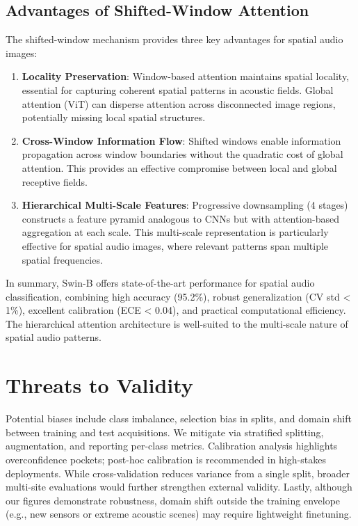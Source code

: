 \documentclass[11pt,a4paper]{article}
\begin{document}
\subsection{Advantages of Shifted-Window Attention}

The shifted-window mechanism provides three key advantages for spatial audio images:

\begin{enumerate}[leftmargin=*]
\item \textbf{Locality Preservation}: Window-based attention maintains spatial locality, essential for capturing coherent spatial patterns in acoustic fields. Global attention (ViT) can disperse attention across disconnected image regions, potentially missing local spatial structures.

\item \textbf{Cross-Window Information Flow}: Shifted windows enable information propagation across window boundaries without the quadratic cost of global attention. This provides an effective compromise between local and global receptive fields.

\item \textbf{Hierarchical Multi-Scale Features}: Progressive downsampling (4 stages) constructs a feature pyramid analogous to CNNs but with attention-based aggregation at each scale. This multi-scale representation is particularly effective for spatial audio images, where relevant patterns span multiple spatial frequencies.
\end{enumerate}

In summary, Swin-B offers state-of-the-art performance for spatial audio classification, combining high accuracy (95.2\%), robust generalization (CV std < 1\%), excellent calibration (ECE < 0.04), and practical computational efficiency. The hierarchical attention architecture is well-suited to the multi-scale nature of spatial audio patterns.

\section{Threats to Validity}
Potential biases include class imbalance, selection bias in splits, and domain shift between training and test acquisitions. We mitigate via stratified splitting, augmentation, and reporting per-class metrics. Calibration analysis highlights overconfidence pockets; post-hoc calibration is recommended in high-stakes deployments. While cross-validation reduces variance from a single split, broader multi-site evaluations would further strengthen external validity. Lastly, although our figures demonstrate robustness, domain shift outside the training envelope (e.g., new sensors or extreme acoustic scenes) may require lightweight finetuning.
\end{document}
